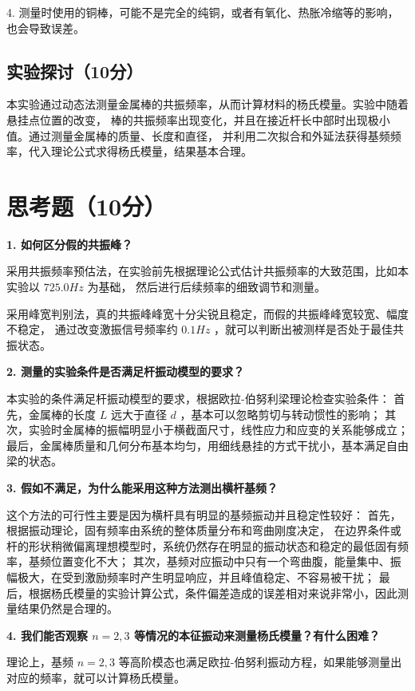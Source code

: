 \documentclass{Phyport}
\begin{document}
4. 测量时使用的铜棒，可能不是完全的纯铜，或者有氧化、热胀冷缩等的影响，也会导致误差。

\subsection{实验探讨（10分）}

本实验通过动态法测量金属棒的共振频率，从而计算材料的杨氏模量。实验中随着悬挂点位置的改变，
棒的共振频率出现变化，并且在接近杆长中部时出现极小值。通过测量金属棒的质量、长度和直径，
并利用二次拟合和外延法获得基频频率，代入理论公式求得杨氏模量，结果基本合理。

\section{思考题（10分）}

\textbf{1. 如何区分假的共振峰？}

采用共振频率预估法，在实验前先根据理论公式估计共振频率的大致范围，比如本实验以 $725.0 Hz$ 为基础，
然后进行后续频率的细致调节和测量。

采用峰宽判别法，真的共振峰峰宽十分尖锐且稳定，而假的共振峰峰宽较宽、幅度不稳定，
通过改变激振信号频率约 $0.1Hz$ ，就可以判断出被测样是否处于最佳共振状态。

\textbf{2. 测量的实验条件是否满足杆振动模型的要求？}

本实验的条件满足杆振动模型的要求，根据欧拉-伯努利梁理论检查实验条件：
首先，金属棒的长度 $L$ 远大于直径 $d$ ，基本可以忽略剪切与转动惯性的影响；
其次，实验时金属棒的振幅明显小于横截面尺寸，线性应力和应变的关系能够成立；
最后，金属棒质量和几何分布基本均匀，用细线悬挂的方式干扰小，基本满足自由梁的状态。

\textbf{3. 假如不满足，为什么能采用这种方法测出横杆基频？}

这个方法的可行性主要是因为横杆具有明显的基频振动并且稳定性较好：
首先，根据振动理论，固有频率由系统的整体质量分布和弯曲刚度决定，
在边界条件或杆的形状稍微偏离理想模型时，系统仍然存在明显的振动状态和稳定的最低固有频率，基频位置变化不大；
其次，基频对应振动中只有一个弯曲腹，能量集中、振幅极大，在受到激励频率时产生明显响应，并且峰值稳定、不容易被干扰；
最后，根据杨氏模量的实验计算公式，条件偏差造成的误差相对来说非常小，因此测量结果仍然是合理的。

\textbf{4. 我们能否观察 $n=2, 3$ 等情况的本征振动来测量杨氏模量？有什么困难？}

理论上，基频 $n=2, 3$ 等高阶模态也满足欧拉-伯努利振动方程，如果能够测量出对应的频率，就可以计算杨氏模量。
\end{document}
